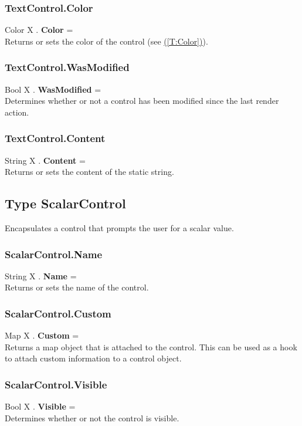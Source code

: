 \documentclass[10pt]{book}
\newcommand{\linkitem}[1]{\hyperref[#1]{\nameref{#1} (\ref{#1})}}
\begin{document}
\subsubsection{TextControl.Color \label{F:TextControl:Color}}
Color X . \textbf{Color} = \\
Returns or sets the color of the control (see \linkitem{T:Color}).

\subsubsection{TextControl.WasModified \label{F:TextControl:WasModified}}
Bool X . \textbf{WasModified} = \\
Determines whether or not a control has been modified since the last render action.

\subsubsection{TextControl.Content \label{F:TextControl:Content}}
String X . \textbf{Content} = \\
Returns or sets the content of the static string.

\subsection{Type ScalarControl \label{T:ScalarControl}}
Encapsulates a control that prompts the user for a scalar value.

\subsubsection{ScalarControl.Name \label{F:ScalarControl:Name}}
String X . \textbf{Name} = \\
Returns or sets the name of the control.

\subsubsection{ScalarControl.Custom \label{F:ScalarControl:Custom}}
Map X . \textbf{Custom} = \\
Returns a map object that is attached to the control. This can be used as a hook to attach custom information to a control object.

\subsubsection{ScalarControl.Visible \label{F:ScalarControl:Visible}}
Bool X . \textbf{Visible} = \\
Determines whether or not the control is visible.
\end{document}
